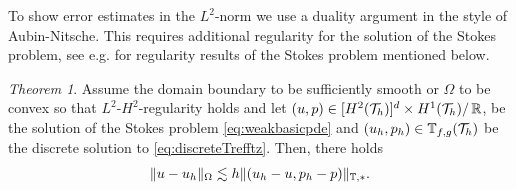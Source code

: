 \documentclass[pdflatex,sn-mathphys,Numbered]{sn-jnl}%
\theoremstyle{remark}%
\newtheorem{theorem}{Theorem}%
\theoremstyle{definition}%
\begin{document}
To show error estimates in the $L^2$-norm we use a duality argument in the style of Aubin-Nitsche. This requires additional regularity for the solution of the Stokes problem, see e.g. \cite{10.3792/pjaa.67.171} for regularity results of the Stokes problem mentioned below.

\begin{theorem} \label{th::aubin}
  Assume the domain boundary to be sufficiently smooth or $\Omega$ to
  be convex so that $L^2$-$H^2$-regularity holds and let $(u,p) \in
  [H^{2}({\mathcal{T}_h})]^d \times H^{1}({\mathcal{T}_h}) /\, \mathbb{R}$, be the solution of
  the Stokes problem \eqref{eq:weakbasicpde} and $(u_h,p_h) \in
  \mathbb{T}_{f,g}({\mathcal{T}_h})$ be the discrete solution to \eqref{eq:discreteTrefftz}.
  Then, there holds
  \begin{equation} \label{eq::aubinerror}
    \Vert u-u_h \Vert_{\Omega} \lesssim h \Vert (u_h-u,p_h-p) \Vert_{\mathbb{T},\ast}.
  \end{equation}
\end{theorem}
\end{document}
